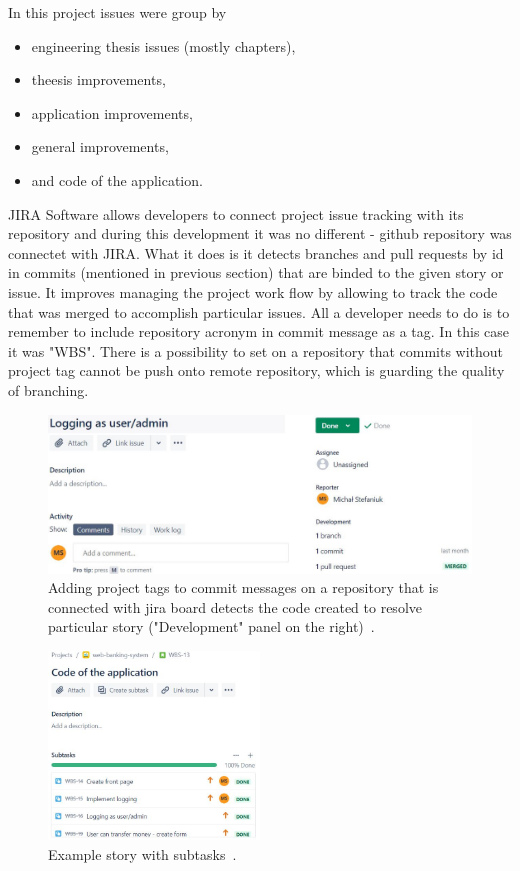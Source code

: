 \documentclass[a4paper,12pt]{book}
\begin{document}
{\bigskip
In this project issues were group by
\begin{itemize}
	\item engineering thesis issues (mostly chapters),
	\item theesis improvements,
	\item application improvements,
	\item general improvements,
	\item and code of the application.
\end{itemize}
	
JIRA Software allows developers to connect project issue tracking with its repository and during this development it was no different - github repository was connectet with JIRA. What it does is it detects branches and pull requests by id in commits (mentioned in previous section) that are binded to the given story or issue. It improves managing the project work flow by allowing to track the code that was merged to accomplish particular issues. All a developer needs to do is to remember to include repository acronym in commit message as a tag. In this case it was "WBS". There is a possibility to set on a repository that commits without project tag cannot be push onto remote repository, which is guarding the quality of branching.

\begin{figure}[H]
  \centering
    \includegraphics[width=1.0\textwidth]{issue}
    \caption{Adding project tags to commit messages on a repository that is connected with jira board detects the code created to resolve particular story ("Development" panel on the right)~\cite{jiraboard}.}
    \label{fig:first}
\end{figure} 
    
\begin{figure}[H]
  \centering
    \includegraphics[width=0.5\textwidth]{applicationstory}
    \caption{Example story with subtasks~\cite{jiraboard}.}
    \label{fig:second}
\end{figure}
    
}
\end{document}
